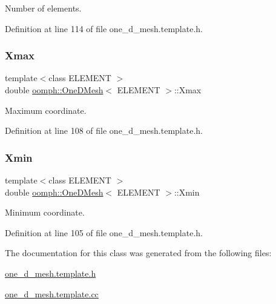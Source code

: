 Number of elements. 



Definition at line 114 of file one\+\_\+d\+\_\+mesh.\+template.\+h.

\mbox{\label{classoomph_1_1OneDMesh_ac625d93f5299895ad5801918a20aea31}} 
\subsubsection{\texorpdfstring{Xmax}{Xmax}}
{\footnotesize\ttfamily template$<$class E\+L\+E\+M\+E\+NT $>$ \\
double \hyperlink{classoomph_1_1OneDMesh}{oomph\+::\+One\+D\+Mesh}$<$ E\+L\+E\+M\+E\+NT $>$\+::Xmax\hspace{0.3cm}{\ttfamily [protected]}}



Maximum coordinate. 



Definition at line 108 of file one\+\_\+d\+\_\+mesh.\+template.\+h.

\mbox{\label{classoomph_1_1OneDMesh_ab1c25c2437f203dd1f6d42ec0613e6a1}} 
\subsubsection{\texorpdfstring{Xmin}{Xmin}}
{\footnotesize\ttfamily template$<$class E\+L\+E\+M\+E\+NT $>$ \\
double \hyperlink{classoomph_1_1OneDMesh}{oomph\+::\+One\+D\+Mesh}$<$ E\+L\+E\+M\+E\+NT $>$\+::Xmin\hspace{0.3cm}{\ttfamily [protected]}}



Minimum coordinate. 



Definition at line 105 of file one\+\_\+d\+\_\+mesh.\+template.\+h.



The documentation for this class was generated from the following files\+:\begin{DoxyCompactItemize}
\item 
\hyperlink{one__d__mesh_8template_8h}{one\+\_\+d\+\_\+mesh.\+template.\+h}\item 
\hyperlink{one__d__mesh_8template_8cc}{one\+\_\+d\+\_\+mesh.\+template.\+cc}\end{DoxyCompactItemize}
